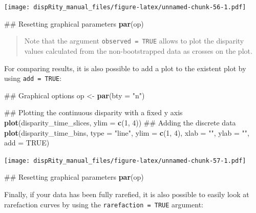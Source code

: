 \documentclass[]{book}
\newenvironment{Shaded}{\begin{snugshade}}{\end{snugshade}}
\newcommand{\KeywordTok}[1]{\textcolor[rgb]{0.13,0.29,0.53}{\textbf{#1}}}
\newcommand{\DataTypeTok}[1]{\textcolor[rgb]{0.13,0.29,0.53}{#1}}
\newcommand{\DecValTok}[1]{\textcolor[rgb]{0.00,0.00,0.81}{#1}}
\newcommand{\StringTok}[1]{\textcolor[rgb]{0.31,0.60,0.02}{#1}}
\newcommand{\OtherTok}[1]{\textcolor[rgb]{0.56,0.35,0.01}{#1}}
\newcommand{\NormalTok}[1]{#1}
\theoremstyle{definition}
\theoremstyle{definition}
\theoremstyle{definition}
\theoremstyle{remark}
\begin{document}
\texttt{[image: dispRity\_manual\_files/figure-latex/unnamed-chunk-56-1.pdf]}

\begin{Shaded}
\begin{Highlighting}[]
\NormalTok{## Resetting graphical parameters}
\KeywordTok{par}\NormalTok{(op)}
\end{Highlighting}
\end{Shaded}

\begin{quote}
Note that the argument \texttt{observed\ =\ TRUE} allows to plot the
disparity values calculated from the non-bootstrapped data as crosses on
the plot.
\end{quote}

For comparing results, it is also possible to add a plot to the existent
plot by using \texttt{add\ =\ TRUE}:

\begin{Shaded}
\begin{Highlighting}[]
\NormalTok{## Graphical options}
\NormalTok{op <-}\StringTok{ }\KeywordTok{par}\NormalTok{(}\DataTypeTok{bty =} \StringTok{"n"}\NormalTok{)}

\NormalTok{## Plotting the continuous disparity with a fixed y axis}
\KeywordTok{plot}\NormalTok{(disparity_time_slices, }\DataTypeTok{ylim =} \KeywordTok{c}\NormalTok{(}\DecValTok{1}\NormalTok{, }\DecValTok{4}\NormalTok{))}
\NormalTok{## Adding the discrete data}
\KeywordTok{plot}\NormalTok{(disparity_time_bins, }\DataTypeTok{type =} \StringTok{"line"}\NormalTok{, }\DataTypeTok{ylim =} \KeywordTok{c}\NormalTok{(}\DecValTok{1}\NormalTok{, }\DecValTok{4}\NormalTok{), }\DataTypeTok{xlab =} \StringTok{""}\NormalTok{, }\DataTypeTok{ylab =} \StringTok{""}\NormalTok{,}
    \DataTypeTok{add =} \OtherTok{TRUE}\NormalTok{)}
\end{Highlighting}
\end{Shaded}

\texttt{[image: dispRity\_manual\_files/figure-latex/unnamed-chunk-57-1.pdf]}

\begin{Shaded}
\begin{Highlighting}[]
\NormalTok{## Resetting graphical parameters}
\KeywordTok{par}\NormalTok{(op)}
\end{Highlighting}
\end{Shaded}

Finally, if your data has been fully rarefied, it is also possible to
easily look at rarefaction curves by using the
\texttt{rarefaction\ =\ TRUE} argument:
\end{document}
